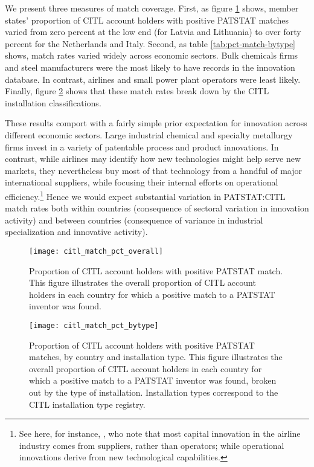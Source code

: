 \documentclass[11pt]{article}
\begin{document}
We present three measures of match coverage. First, as figure
\ref{fig:citl-match-pct} shows, member states' proportion of CITL
account holders with positive PATSTAT matches varied from zero percent
at the low end (for Latvia and Lithuania) to over forty percent for
the Netherlands and Italy. Second, as table \ref{tab:pct-match-bytype}
shows, match rates varied widely across economic sectors. Bulk
chemicals firms and steel manufacturers were the most likely to have
records in the innovation database. In contrast, airlines and small
power plant operators were least likely. Finally, figure
\ref{fig:citl-match-pct-bytype} shows that these match rates break
down by the CITL installation classifications.

These results comport with a fairly simple prior expectation
for innovation across different economic sectors. Large industrial
chemical and specialty metallurgy firms invest in a variety of patentable process
and product innovations. In contrast, while airlines may identify how
new technologies might help serve new markets, they nevertheless buy
most of that technology from a handful of major international suppliers,
while focusing their internal efforts on operational efficiency.\footnote{See here, for instance,
  \cite{brueckner2009technological}, who note that most capital
  innovation in the airline industry comes from suppliers, rather than
  operators; while operational innovations derive from new technological
  capabilities.} Hence we would expect substantial variation in
PATSTAT:CITL match rates both within countries (consequence of sectoral variation
in innovation activity) and between countries (consequence of variance
in industrial specialization and innovative activity). 

\begin{figure}[ht]
  \centering
  \texttt{[image: citl\_match\_pct\_overall]}
  \caption{Proportion of CITL account holders with positive PATSTAT match. This figure illustrates the overall proportion of CITL account holders in each country for which a positive match to a PATSTAT inventor was found.}
  \label{fig:citl-match-pct}
\end{figure}

\begin{figure}[ht]
  \centering
  \texttt{[image: citl\_match\_pct\_bytype]}
  \caption{Proportion of CITL account holders with positive PATSTAT matches, by country and installation type. This figure illustrates the overall proportion of CITL account holders in each country for which a positive match to a PATSTAT inventor was found, broken out by the type of installation. Installation types correspond to the CITL installation type registry.}
  \label{fig:citl-match-pct-bytype}
\end{figure}
\end{document}
